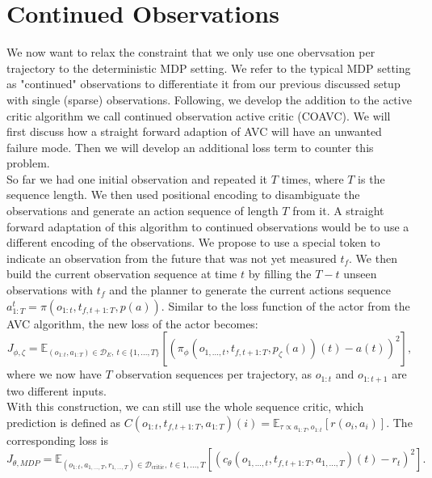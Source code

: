 \section{Continued Observations}
\label{sec:relax_dense}
We now want to relax the constraint that we only use one obervsation per trajectory to the deterministic MDP setting. 
We refer to the typical MDP setting as "continued" observations to differentiate it from our previous discussed setup with single (sparse) observations. 
Following, we develop the addition to the active critic algorithm we call continued observation active critic (COAVC). 
We will first discuss how a straight forward adaption of AVC will have an unwanted failure mode. Then we will develop an additional loss term to counter this problem.\\

So far we had one initial observation and repeated it $T$ times, where $T$ is the sequence length. We then used positional encoding to disambiguate the observations and generate an action sequence of 
length $T$ from it. A straight forward adaptation of this algorithm to continued observations would be to use a different encoding of the observations. We propose to use a special token to indicate an 
observation from the future that was not yet measured $t_f$. We then build the current observation sequence at time $t$ by filling the $T - t$ unseen observations with $t_f$ and 
the planner to 
generate the current actions sequence $a^t_{1:T} = \pi(o_{1:t}, t_{f, t+1:T}, p(a))$. Similar to the loss function of the actor from the AVC algorithm, the new loss of the actor becomes: 
\begin{equation}
    \label{dense_actor_objective}
    J_{\phi, \zeta} = \mathbb{E}_{(o_{1:t}, a_{1:T}) \in \mathcal{D}_E,\ t \in \{1, ..., T\}}\left[\left( \pi_{\phi}(o_{1, ..., t}, t_{f, t+1:T}, p_{\zeta}(a))(t) - a(t)\right)^2\right],
\end{equation}
where we now have $T$ observation sequences per trajectory, as $o_{1:t}$ and $o_{1:t+1}$ are two different inputs.\\
With this construction, we can still use the whole sequence critic, 
which prediction is defined as $C(o_{1:t}, t_{f, t+1:T}, a_{1:T})(i) = \mathbb{E}_{\tau \propto a_{1:T}, o_{1:t}}\left[r(o_i, a_i)\right]$. The corresponding loss is
\begin{equation}
    \label{eq:dense_critic_loss}
    J_{\theta, MDP} = \mathbb{E}_{(o_{1:t}, a_{1,...,T}, r_{1,...,T}) \in \mathcal{D}_{\text{critic}},\ t \in {1, ..., T}}\left[(c_{\theta}(o_{1, ..., t}, t_{f, t+1:T},  a_{1,...,T})(t) - r_t)^2\right].
\end{equation}

